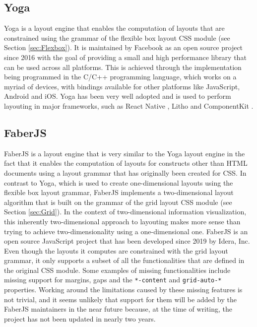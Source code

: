 \subsection{Yoga}

Yoga \parencite{Yoga} is a layout engine that enables the computation of layouts that are constrained using the grammar of the flexible box layout CSS module (see Section \ref{sec:Flexbox}). It is maintained by Facebook as an open source project since 2016 \parencite{YogaRelease} with the goal of providing a small and high performance library that can be used across all platforms. This is achieved through the implementation being programmed in the C/C++ programming language, which works on a myriad of devices, with bindings available for other platforms like JavaScript, Android and iOS. Yoga has been very well adopted and is used to perform layouting in major frameworks, such as React Native \parencite{ReactNative}, Litho \parencite{Litho} and ComponentKit \parencite{ComponentKit}.

\subsection{FaberJS}

FaberJS \parencite{FaberJS} is a layout engine that is very similar to the Yoga layout engine in the fact that it enables the computation of layouts for constructs other than HTML documents using a layout grammar that has originally been created for CSS. In contrast to Yoga, which is used to create one-dimensional layouts using the flexible box layout grammar, FaberJS implements a two-dimensional layout algorithm that is built on the grammar of the grid layout CSS module (see Section \ref{sec:Grid}). In the context of two-dimensional information visualization, this inherently two-dimensional approach to layouting makes more sense than trying to achieve two-dimensionality using a one-dimensional one. FaberJS is an open source JavaScript project that has been developed since 2019 by Idera, Inc. Even though the layouts it computes are constrained with the grid layout grammar, it only supports a subset of all the functionalities that are defined in the original CSS module. Some examples of missing functionalities include missing support for margins, gaps and the \lstinline{*-content} and \lstinline{grid-auto-*} properties. Working around the limitations caused by these missing features is not trivial, and it seems unlikely that support for them will be added by the FaberJS maintainers in the near future because, at the time of writing, the project has not been updated in nearly two years. 